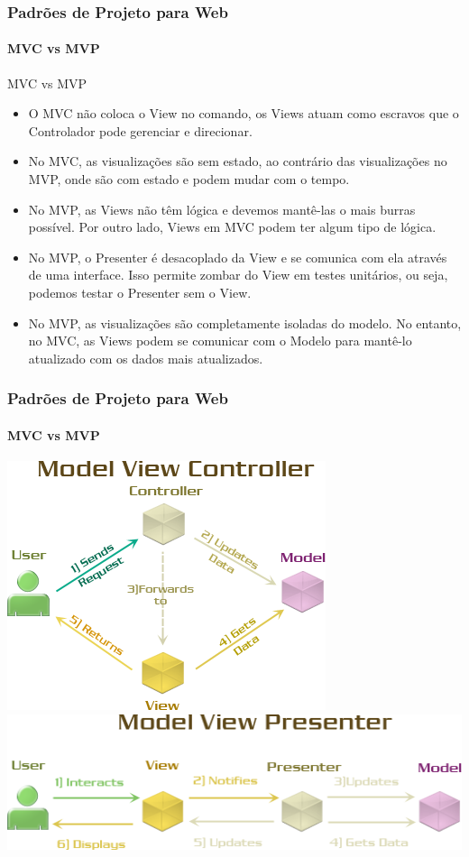 \documentclass[
	10pt, %
	t, %
]{beamer}
\begin{document}
\begin{frame}
	\frametitle{Padrões de Projeto para Web}
	\framesubtitle{MVC vs MVP}

	\begin{block}{MVC vs MVP}
		\begin{itemize}
			\item O \alert{MVC} não coloca o View no comando, os Views atuam como escravos que o Controlador pode gerenciar e direcionar.
			\item No \alert{MVC}, as visualizações são sem estado, ao contrário das visualizações no MVP, onde são com estado e podem mudar com o tempo.
			\item No \alert{MVP}, as Views não têm lógica e devemos mantê-las o mais burras possível. Por outro lado, Views em MVC podem ter algum tipo de lógica.
			\item No \alert{MVP}, o Presenter é desacoplado da View e se comunica com ela através de uma interface. Isso permite zombar do View em testes unitários, ou seja, podemos testar o Presenter sem o View.
			\item No \alert{MVP}, as visualizações são completamente isoladas do modelo. No entanto, no MVC, as Views podem se comunicar com o Modelo para mantê-lo atualizado com os dados mais atualizados.
		\end{itemize}
	\end{block}

\end{frame}

\begin{frame}
	\frametitle{Padrões de Projeto para Web}
	\framesubtitle{MVC vs MVP}

	\centering
	\includegraphics[width=0.5\linewidth]{Images/mvc2.png}
	\includegraphics[width=0.8\linewidth]{Images/mvp2.png}

\end{frame}
\end{document}
